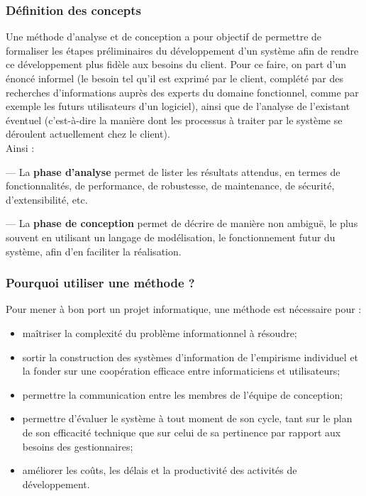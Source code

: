 \documentclass[a4paper, 12pt]{report}
\begin{document}
\subsubsection{Définition des concepts}
Une méthode d'analyse et de conception a pour objectif de permettre de formaliser les étapes préliminaires du développement d'un système afin de rendre ce développement plus fidèle aux besoins du client. Pour ce faire, on part d'un énoncé informel (le besoin tel qu'il est exprimé par le client, complété par des recherches d'informations auprès des experts du domaine fonctionnel, comme par exemple les futurs utilisateurs d'un logiciel), ainsi que de l'analyse de l'existant éventuel (c'est-à-dire la manière dont les processus à traiter par le système se déroulent actuellement chez le client). \\Ainsi :

 --- La  \textbf{phase d'analyse} permet de lister les résultats attendus, en termes de fonctionnalités, de performance, de robustesse, de maintenance, de sécurité, d'extensibilité, etc.
 
 --- La \textbf{phase de conception} permet de décrire de manière non ambiguë, le plus souvent en utilisant un langage de modélisation, le fonctionnement futur du système, afin d'en faciliter la réalisation.
\subsubsection{Pourquoi utiliser  une méthode ?}
Pour mener à bon port un projet informatique, une méthode est nécessaire pour :

\begin{itemize}
  \item maîtriser la complexité du problème informationnel à résoudre;
  \item sortir la construction des systèmes d'information de l'empirisme individuel et la fonder sur une coopération efficace entre informaticiens et utilisateurs;
  \item permettre la communication entre les membres de l'équipe de conception;
  \item permettre d'évaluer le système à tout moment de son cycle, tant sur le plan de son efficacité technique que sur celui de sa pertinence par rapport aux besoins des gestionnaires;
  \item améliorer les coûts, les délais et la productivité des activités de développement.
\end{itemize}
\end{document}
